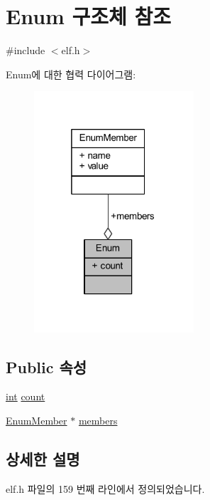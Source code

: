 \hypertarget{struct_enum}{}\section{Enum 구조체 참조}
\label{struct_enum}


{\ttfamily \#include $<$elf.\+h$>$}



Enum에 대한 협력 다이어그램\+:\nopagebreak
\begin{figure}[H]
\begin{center}
\leavevmode
\includegraphics[width=169pt]{struct_enum__coll__graph}
\end{center}
\end{figure}
\subsection*{Public 속성}
\begin{DoxyCompactItemize}
\item 
\mbox{\hyperlink{_util_8cpp_a0ef32aa8672df19503a49fab2d0c8071}{int}} \mbox{\hyperlink{struct_enum_abe9638dad7a7d68bde2843b2b80c8659}{count}}
\item 
\mbox{\hyperlink{struct_enum_member}{Enum\+Member}} $\ast$ \mbox{\hyperlink{struct_enum_ab6bd4304bb7b4f66498268417ca1ef00}{members}}
\end{DoxyCompactItemize}


\subsection{상세한 설명}


elf.\+h 파일의 159 번째 라인에서 정의되었습니다.



